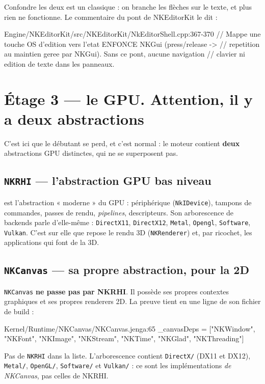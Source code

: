 Confondre les deux est un classique : on branche les flèches sur le texte, et
plus rien ne fonctionne. Le commentaire du pont de NKEditorKit le dit :

\begin{nkcode}{Engine/NKEditorKit/src/NKEditorKit/NkEditorShell.cpp:367-370}
// Mappe une touche OS d'edition vers l'etat ENFONCE NKGui (press/release ->
// repetition au maintien geree par NKGui). Sans ce pont, aucune navigation
// clavier ni edition de texte dans les panneaux.
\end{nkcode}

\section{Étage 3 — le GPU. Attention, il y a deux abstractions}

C'est ici que le débutant se perd, et c'est normal : le moteur contient
\textbf{deux} abstractions GPU distinctes, qui ne se superposent pas.

\subsection{\texttt{NKRHI} — l'abstraction GPU bas niveau}

 est l'abstraction « moderne » du GPU :
périphérique (\texttt{NkIDevice}), tampons de commandes, passes de rendu,
\emph{pipelines}, descripteurs. Son arborescence de backends parle d'elle-même :
\texttt{DirectX11}, \texttt{DirectX12}, \texttt{Metal}, \texttt{Opengl},
\texttt{Software}, \texttt{Vulkan}. C'est sur elle que repose le rendu 3D
(\texttt{NKRenderer}) et, par ricochet, les applications qui font de la 3D.

\subsection{\texttt{NKCanvas} — sa propre abstraction, pour la 2D}

\texttt{NKCanvas} \textbf{ne passe pas par NKRHI}. Il possède ses propres
contextes graphiques et ses propres renderers 2D. La preuve tient en une ligne
de son fichier de build :

\begin{nkcode}{Kernel/Runtime/NKCanvas/NKCanvas.jenga:65}
    _canvasDeps = ["NKWindow", "NKFont", "NKImage", "NKStream", "NKTime", "NKGlad", "NKThreading"]
\end{nkcode}

Pas de \texttt{NKRHI} dans la liste. L'arborescence
 contient
\texttt{DirectX/} (DX11 et DX12), \texttt{Metal/}, \texttt{OpenGL/},
\texttt{Software/} et \texttt{Vulkan/} : ce sont les implémentations \emph{de
NKCanvas}, pas celles de NKRHI.

